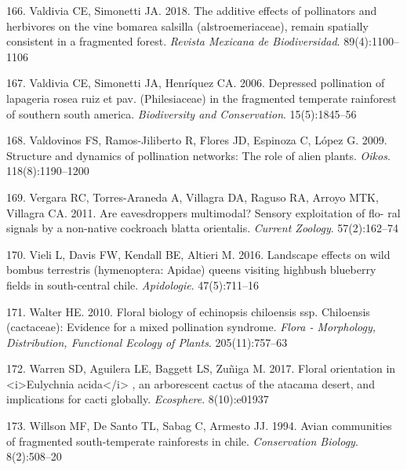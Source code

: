 \documentclass[
]{article}
\begin{document}
\leavevmode\hypertarget{ref-RN80}{}%
166. Valdivia CE, Simonetti JA. 2018. The additive effects of
pollinators and herbivores on the vine bomarea salsilla
(alstroemeriaceae), remain spatially consistent in a fragmented forest.
\emph{Revista Mexicana de Biodiversidad}. 89(4):1100--1106

\leavevmode\hypertarget{ref-RN161}{}%
167. Valdivia CE, Simonetti JA, Henríquez CA. 2006. Depressed
pollination of lapageria rosea ruiz et pav. (Philesiaceae) in the
fragmented temperate rainforest of southern south america.
\emph{Biodiversity and Conservation}. 15(5):1845--56

\leavevmode\hypertarget{ref-RN163}{}%
168. Valdovinos FS, Ramos-Jiliberto R, Flores JD, Espinoza C, López G.
2009. Structure and dynamics of pollination networks: The role of alien
plants. \emph{Oikos}. 118(8):1190--1200

\leavevmode\hypertarget{ref-RN82}{}%
169. Vergara RC, Torres-Araneda A, Villagra DA, Raguso RA, Arroyo MTK,
Villagra CA. 2011. Are eavesdroppers multimodal? Sensory exploitation of
flo- ral signals by a non-native cockroach blatta orientalis.
\emph{Current Zoology}. 57(2):162--74

\leavevmode\hypertarget{ref-RN83}{}%
170. Vieli L, Davis FW, Kendall BE, Altieri M. 2016. Landscape effects
on wild bombus terrestris (hymenoptera: Apidae) queens visiting highbush
blueberry fields in south-central chile. \emph{Apidologie}.
47(5):711--16

\leavevmode\hypertarget{ref-RN164}{}%
171. Walter HE. 2010. Floral biology of echinopsis chiloensis ssp.
Chiloensis (cactaceae): Evidence for a mixed pollination syndrome.
\emph{Flora - Morphology, Distribution, Functional Ecology of Plants}.
205(11):757--63

\leavevmode\hypertarget{ref-RN84}{}%
172. Warren SD, Aguilera LE, Baggett LS, Zuñiga M. 2017. Floral
orientation in \textless i\textgreater Eulychnia
acida\textless/i\textgreater{} , an arborescent cactus of the atacama
desert, and implications for cacti globally. \emph{Ecosphere}.
8(10):e01937

\leavevmode\hypertarget{ref-RN85}{}%
173. Willson MF, De Santo TL, Sabag C, Armesto JJ. 1994. Avian
communities of fragmented south-temperate rainforests in chile.
\emph{Conservation Biology}. 8(2):508--20
\end{document}
